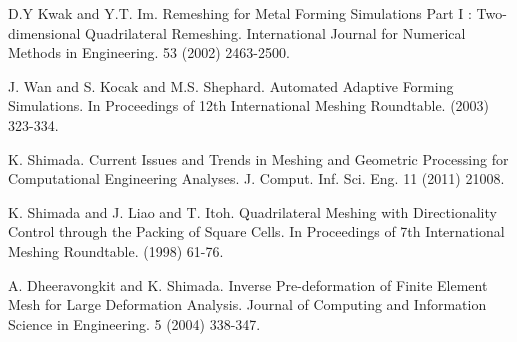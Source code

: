 
\begin{thebibliography}{10}

{\sc D.Y Kwak and Y.T. Im}. {Remeshing for Metal Forming Simulations Part I : Two-dimensional Quadrilateral Remeshing}. International Journal for Numerical Methods in Engineering. 53 (2002) 2463-2500.



{\sc J. Wan and S. Kocak and M.S. Shephard}. {Automated Adaptive Forming Simulations}. In Proceedings of 12th International Meshing Roundtable. (2003) 323-334.



{\sc K. Shimada}. {Current Issues and Trends in Meshing and Geometric Processing for Computational Engineering Analyses}. J. Comput. Inf. Sci. Eng. 11 (2011) 21008.



{\sc K. Shimada and J. Liao and T. Itoh}. {Quadrilateral Meshing with Directionality Control through the Packing of Square Cells}. In Proceedings of 7th International Meshing Roundtable. (1998) 61-76.



{\sc A. Dheeravongkit and K. Shimada}. {Inverse Pre-deformation of Finite Element Mesh for Large Deformation Analysis}. Journal of Computing and Information Science in Engineering. 5 (2004) 338-347.

\end{thebibliography}
